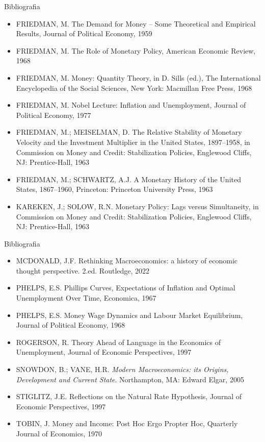 \documentclass[10pt]{beamer}
\begin{document}
\begin{frame}{ Bibliografia}
    \begin{itemize}                        
        \item FRIEDMAN, M. The Demand for Money – Some Theoretical and Empirical Results, Journal of Political Economy, 1959 \medskip
        \item FRIEDMAN, M. The Role of Monetary Policy, American Economic Review, 1968 \medskip
        \item FRIEDMAN, M. Money: Quantity Theory, in D. Sills (ed.), The International Encyclopedia of the Social Sciences, New York: Macmillan Free Press, 1968 \medskip
        \item FRIEDMAN, M. Nobel Lecture: Inflation and Unemployment, Journal of Political Economy, 1977 \medskip
        \item FRIEDMAN, M.; MEISELMAN, D. The Relative Stability of Monetary Velocity and the Investment Multiplier in the United States, 1897–1958, in Commission on Money and Credit: Stabilization Policies, Englewood Cliffs, NJ: Prentice-Hall, 1963 \medskip
        \item FRIEDMAN, M.; SCHWARTZ, A.J. A Monetary History of the United States, 1867–1960, Princeton: Princeton University Press, 1963 \medskip
        \item KAREKEN, J.; SOLOW, R.N. Monetary Policy: Lags versus Simultaneity, in Commission on Money and Credit: Stabilization Policies, Englewood Cliffs, NJ: Prentice-Hall, 1963 \medskip        
    \end{itemize}
\end{frame}

\begin{frame}{ Bibliografia}
    \begin{itemize}                        
        \item MCDONALD, J.F. Rethinking Macroeconomics: a history of economic thought perspective. 2.ed. Routledge, 2022\medskip
        \item PHELPS, E.S. Phillips Curves, Expectations of Inflation and Optimal Unemployment Over Time, Economica, 1967 \medskip
        \item PHELPS, E.S. Money Wage Dynamics and Labour Market Equilibrium, Journal of Political Economy, 1968 \medskip
        \item ROGERSON, R. Theory Ahead of Language in the Economics of Unemployment, Journal of Economic Perspectives, 1997 \medskip
        \item SNOWDON, B.; VANE, H.R. \emph{Modern Macroeconomics: its Origins, Development and Current State}. Northampton, MA: Edward Elgar, 2005\medskip        
        \item STIGLITZ, J.E. Reflections on the Natural Rate Hypothesis, Journal of Economic Perspectives, 1997 \medskip
        \item TOBIN, J. Money and Income: Post Hoc Ergo Propter Hoc, Quarterly Journal of Economics, 1970 \medskip        
    \end{itemize}
\end{frame}
\end{document}
